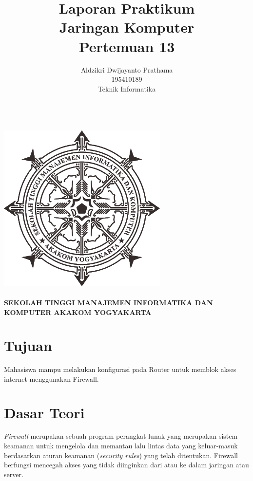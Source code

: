 \documentclass[a4paper,12pt]{article}
\begin{document}
\title{ {\Large Laporan Praktikum}\\ Jaringan Komputer \\{\Large Pertemuan 13}}

\author{Aldzikri Dwijayanto Prathama 
	\\195410189
	\\Teknik Informatika}
\makeatletter
\begin{titlepage}
	\begin{center}
		{\huge \bfseries \@title }\\[14ex]
		\includegraphics[scale=.8]{logo}\\[4ex]
		{\large \@author}\\[19ex]
		{\large \bfseries {SEKOLAH TINGGI MANAJEMEN INFORMATIKA DAN KOMPUTER
				AKAKOM YOGYAKARTA}}
	\end{center}


\end{titlepage}
\makeatother
\newpage
\tableofcontents
\newpage

\section{Tujuan}
\paragraph{}
Mahasiswa mampu melakukan konfigurasi pada Router untuk memblok akses internet
menggunakan Firewall.

\section{Dasar Teori}
\paragraph{}
\textit{Firewall} merupakan sebuah program perangkat lunak yang merupakan sistem
keamanan untuk mengelola dan memantau lalu lintas data yang keluar-masuk berdasarkan
aturan keamanan (\textit{security rules}) yang telah ditentukan. Firewall berfungsi mencegah
akses yang tidak diinginkan dari atau ke dalam jaringan atau server.
\end{document}
